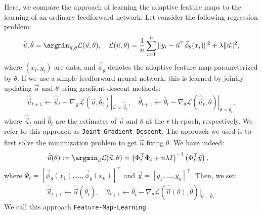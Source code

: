Here, we compare the approach of learning the adaptive feature maps to the learning of an ordinary feedforward network. Let consider the following regression problem:
\begin{align*}
    \hat{\vec{u}}, \hat{\theta} = \argmin_{\vec{u}, \theta} \mathcal{L}(\vec{u}, \theta), \quad \mathcal{L}(\vec{u}, \theta)=\frac{1}{n} \sum_{i=1}^n \|y_i - \vec{u}^\top \vec{\phi}_\theta(x_i)\|^2 + \lambda\|\vec{u}\|^2,
\end{align*}
where $(x_i, y_i)$ are data, and $\vec{\phi}_\theta$ denotes the adaptive feature map parameterized by $\theta$. If we use a simple feedforward neural network, this is learned by jointly updating $\vec{u}$ and $\theta$ using gradient descent methods:
\begin{align*}
    \hat{\vec{u}}_{t+1} \leftarrow \hat{\vec{u}}_{t} - \nabla_{\vec{u}}  \mathcal{L}(\vec{u}, \hat{\theta}_t)|_{\vec{u}=\hat{\vec{u}}_{t}}, \quad \hat{\theta}_{t+1} \leftarrow \hat{\theta}_{t} - \nabla_{\theta}  \mathcal{L}(\hat{\vec{u}}_t, \theta)|_{\theta=\hat{\theta}_{t}},
\end{align*}
where $\hat{\vec{u}}_t$ and $\hat{\theta}_t$ are the estimates of $\vec{u}$ and $\theta$ at the $t$-th epoch, respectively.
We refer to this approach as {\tt Joint-Gradient-Descent}. The approach we used is to first solve the minimization problem to get $\hat{\vec{u}}$ fixing $\theta$. We have indeed:
\begin{align*}
    \hat{\vec{u}}(\theta)&:= \argmin_{\vec{u}} \mathcal{L}(\vec{u}, \theta)=\left(\Phi_t^\top \Phi_t + n \lambda I\right)^{-1}\left(\Phi_t^\top \vec{y}\right),
\end{align*}
where $\Phi_t = [\vec{\phi}_{\theta}(x_1), \dots, \vec{\phi}_{\theta}(x_n)]^\top$ and  $\vec{y} = [y_1, \dots, y_n]^\top$. 
Then, we set:
\begin{align*}
    \hat{\vec{u}}_{t+1} \leftarrow \hat{\vec{u}}(\hat{\theta}_t), \quad 
    \hat{\theta}_{t+1} \leftarrow \hat{\theta}_{t} - \nabla_{\theta}\mathcal{L}(\hat{\vec{u}}(\theta),\theta)|_{\theta=\hat{\theta}_t}.
\end{align*}
We call this approach {\tt Feature-Map-Learning}. 

